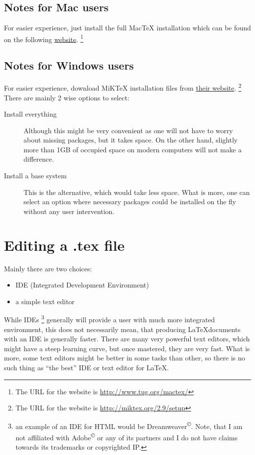 \documentclass[a4paper]{article}
\begin{document}
\subsection{Notes for Mac users}

For easier experience, just install the full MacTeX installation which can be
found on the following \href{http://www.tug.org/mactex/}{website}.
\footnote{The URL for the website is \url{http://www.tug.org/mactex/}}

\subsection{Notes for Windows users}

For easier experience, download MiKTeX installation files from
\href{http://miktex.org/2.9/setup}{their website}.
\footnote{The URL for the website is \url{http://miktex.org/2.9/setup}}
There are mainly 2 wise options to select:
\begin{description}
    \item[Install everything] Although this might be very convenient as
        one will not have to worry about missing packages, but it takes space.
        On the other hand, slightly more than 1GB of occupied space on modern
        computers will not make a difference.
    \item[Install a base system] This is the alternative, which would take less
        space. What is more, one can select an option where necessary packages
        could be installed on the fly without any user intervention.
\end{description}

\section{Editing a .tex file}

Mainly there are two choices:
\begin{itemize}
    \item IDE (Integrated Development Environment)
    \item a simple text editor
\end{itemize}

While IDEs
\footnote{an example of an IDE for HTML would be
Dreamweaver\textsuperscript{\copyright}. Note, that I am not affiliated with
Adobe\textsuperscript{\copyright} or any of its partners and I do not have
claims towards its trademarks or copyrighted IP.}
generally will provide a user with much more integrated environment,
this does not necessarily mean, that producing \LaTeX documents with an IDE is
generally faster. There are many very powerful text editors, which might have a
steep learning curve, but once mastered, they are very fast. What is more, some
text editors might be better in some tasks than other, so there is no such thing
as ``the best'' IDE or text editor for \LaTeX.
\end{document}

